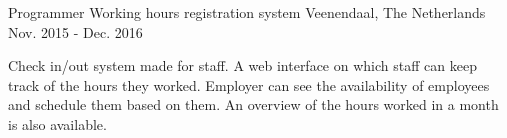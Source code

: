 


\begin{cventries}


\cventry
{Programmer} %
{Working hours registration system} %
{Veenendaal, The Netherlands} %
{Nov. 2015 - Dec. 2016} %
{ %
\begin{cvitems}
\item {Check in/out system made for staff. A web interface on which staff can keep track of the hours they worked. Employer can see the availability of employees and schedule them based on them. An overview of the hours worked in a month is also available.}
\end{cvitems}
}


\end{cventries}